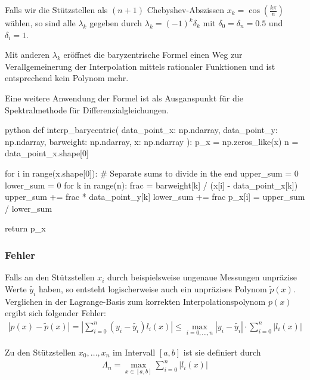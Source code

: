 Falls wir die Stützstellen als $(n + 1)$ Chebyshev-Abszissen $\displaystyle x_k = \cos\left( \frac{k\pi}{n} \right)$ wählen,
so sind alle $\lambda_k$ gegeben durch $\lambda_k = (-1)^k \delta_k$ mit $\delta_0 = \delta_n = 0.5$ und $\delta_i = 1$.

Mit anderen $\lambda_k$ eröffnet die baryzentrische Formel einen Weg zur Verallgemeinerung der Interpolation mittels rationaler Funktionen und ist entsprechend kein Polynom mehr.

Eine weitere Anwendung der Formel ist als Ausganspunkt für die Spektralmethode für Differenzialgleichungen.

\begin{code}{python}
    def interp_barycentric(
        data_point_x: np.ndarray,
        data_point_y: np.ndarray,
        barweight: np.ndarray,
        x: np.ndarray
    ):
        p_x = np.zeros_like(x)
        n = data_point_x.shape[0]

        for i in range(x.shape[0]):
            # Separate sums to divide in the end
            upper_sum = 0
            lower_sum = 0
            for k in range(n):
                frac = barweight[k] / (x[i] - data_point_x[k])
                upper_sum += frac * data_point_y[k]
                lower_sum += frac
            p_x[i] = upper_sum / lower_sum

        return p_x
\end{code}


\newpage
\subsubsection{Fehler}
Falls an den Stützstellen $x_i$ durch beispielsweise ungenaue Messungen unpräzise Werte $\tilde{y_i}$ haben, so entsteht logischerweise auch ein unpräzises Polynom $\tilde{p}(x)$.
Verglichen in der Lagrange-Basis zum korrekten Interpolationspolynom $p(x)$ ergibt sich folgender Fehler:
\begin{align*}
	|p(x) - \tilde{p}(x)| = \left| \sum_{i = 0}^{n} (y_i - \tilde{y_i}) l_i(x) \right| \leq \max_{i = 0, \ldots, n} |y_i - \tilde{y_i}| \cdot \sum_{i = 0}^{n} |l_i(x)|
\end{align*}


 Zu den Stützstellen $x_0, \ldots, x_n$ im Intervall $[a, b]$ ist sie definiert durch
\rmvspace
\begin{align*}
	\Lambda_n = \max_{x \in [a, b]} \sum_{i = 0}^{n} |l_i(x)|
\end{align*}


